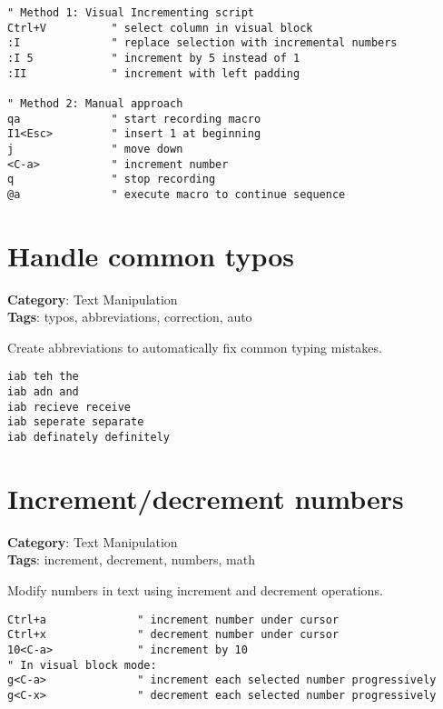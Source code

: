 {{{{{{{{{{{{{{\begin{Exa*}{}
\begin{Verbatim}[fontsize=\footnotesize, breaklines, breakanywhere]
" Method 1: Visual Incrementing script
Ctrl+V          " select column in visual block
:I              " replace selection with incremental numbers
:I 5            " increment by 5 instead of 1
:II             " increment with left padding

" Method 2: Manual approach
qa              " start recording macro
I1<Esc>         " insert 1 at beginning
j               " move down
<C-a>           " increment number
q               " stop recording
@a              " execute macro to continue sequence
\end{Verbatim}
\end{Exa*}

\section{Handle common typos}

\textbf{Category}: Text Manipulation\\ \textbf{Tags}: typos, abbreviations, correction, auto
\vspace{0.5cm}

Create abbreviations to automatically fix common typing mistakes.

\begin{Exa*}{}
\begin{Verbatim}[fontsize=\footnotesize, breaklines, breakanywhere]
iab teh the
iab adn and
iab recieve receive
iab seperate separate
iab definately definitely
\end{Verbatim}
\end{Exa*}

\section{Increment/decrement numbers}

\textbf{Category}: Text Manipulation\\ \textbf{Tags}: increment, decrement, numbers, math
\vspace{0.5cm}

Modify numbers in text using increment and decrement operations.

\begin{Exa*}{}
\begin{Verbatim}[fontsize=\footnotesize, breaklines, breakanywhere]
Ctrl+a              " increment number under cursor
Ctrl+x              " decrement number under cursor
10<C-a>             " increment by 10
" In visual block mode:
g<C-a>              " increment each selected number progressively
g<C-x>              " decrement each selected number progressively
\end{Verbatim}
\end{Exa*}

}}}}}}}}}}}}}}
